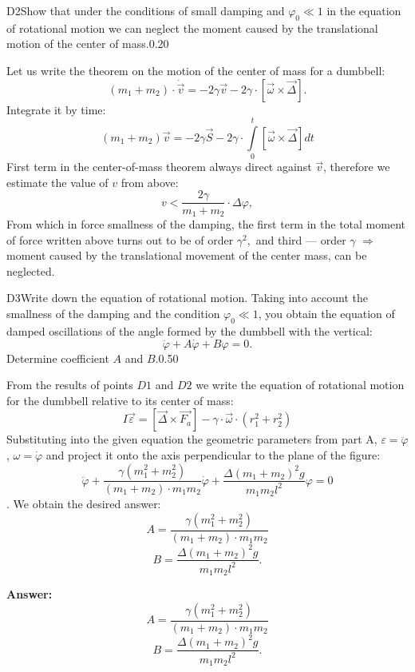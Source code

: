 \documentclass[11pt,a4paper]{article}
\begin{document}
\begin{solcard}{D2}{Show that under the conditions of small damping and $\varphi_0 \ll 1$ in the equation of rotational motion we can neglect the moment caused by the translational motion of the center of mass.}{0.20}

Let us write the theorem on the motion of the center of mass for a dumbbell: $$(m_1+m_2) \cdot \dot{\vec{v}} = - 2 \gamma \vec{v} - 2 \gamma \cdot [\vec{\omega} \times \vec{\Delta}].$$Integrate it by time: $$(m_1+m_2) \vec{v} = -2 \gamma \vec{S} - 2 \gamma \cdot \int\limits_0^t [\vec{\omega} \times \vec{\Delta}] dt$$First term in the center-of-mass theorem always direct against $\vec{v}$, therefore we estimate the value of $v$ from above: $$v < \dfrac{2 \gamma}{m_1+m_2} \cdot \Delta \varphi,$$From which in force smallness of the damping, the first term in the total moment of force written above turns out to be of order $\gamma^2,$ and third — order $\gamma$ $\Rightarrow$ moment caused by the translational movement of the center mass, can be neglected.

\end{solcard}

\begin{solcard}{D3}{Write down the equation of rotational motion. Taking into account the smallness of the damping and the condition $\varphi_0 \ll 1$, you obtain the equation of damped oscillations of the angle formed by the dumbbell with the vertical: $$\ddot{\varphi} + A\dot{\varphi} + B\varphi = 0.$$Determine coefficient $A$ and $B$.}{0.50}

From the results of points $D1$ and $D2$ we write the equation of rotational motion for the dumbbell relative to its center of mass: $$I \vec{\varepsilon} =  [\vec{\Delta} \times \vec{F_a}] - \gamma \cdot \vec{\omega} \cdot (r_1^2+r_2^2)$$Substituting into the given equation the geometric parameters from part A, $\varepsilon = \ddot{\varphi}$, $\omega = \dot{\varphi}$ and project it onto the axis perpendicular to the plane of the figure: $$\ddot{\varphi} + \dfrac{\gamma (m_1^2+m_2^2)}{(m_1+m_2) \cdot m_1 m_2} \dot{\varphi} + \dfrac{\Delta (m_1+m_2)^2 g}{m_1 m_2 l^2} \varphi = 0$$. We obtain the desired answer: $$A = \dfrac{\gamma \left( m_1^2+m_2^2 \right) }{(m_1+m_2) \cdot m_1 m_2}$$$$B = \dfrac{\Delta (m_1+m_2)^2 g}{m_1 m_2 l^2}.$$

\par\smallskip\noindent\textbf{Answer:} $$A = \dfrac{\gamma (m_1^2+m_2^2)}{(m_1+m_2) \cdot m_1 m_2}$$$$B = \dfrac{\Delta (m_1+m_2)^2 g}{m_1 m_2 l^2}.$$
\end{solcard}
\end{document}
